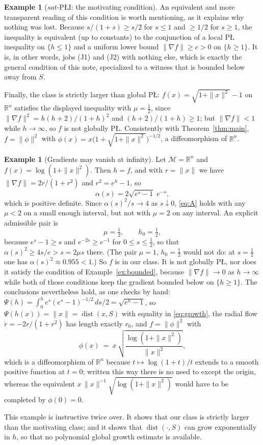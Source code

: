 \documentclass[11pt]{article}
\theoremstyle{plain}
\theoremstyle{definition}
\newtheorem{ex}[thm]{Example}
\theoremstyle{remark}
\newcommand{\M}{\mathcal{M}}
\newcommand{\R}{\mathbb{R}}
\DeclareMathOperator{\dist}{dist}
\begin{document}
\begin{ex}[$sat$-P\L{}I: the motivating condition]
An equivalent and more transparent reading of this condition is worth mentioning,
as it explains why nothing was lost. Because $s/(1+s) \ge s/2$ for $s\le1$ and
$\ge 1/2$ for $s\ge1$, the inequality is equivalent (up to constants) to the
conjunction of a local P\L{} inequality on $\{h\le1\}$ and a uniform lower bound
$\|\nabla f\| \ge c > 0$ on $\{h\ge1\}$. It is, in other words, jobs (J1) and
(J2) with nothing else, which is exactly the general condition of this note,
specialized to a witness that is bounded below away from $S$.

Finally, the class is strictly larger than global P\L{}:
$f(x) = \sqrt{1+\|x\|^2}-1$ on $\R^n$ satisfies the displayed inequality with
$\mu=\tfrac12$, since $\|\nabla f\|^2 = h(h+2)/(1+h)^2$ and
$(h+2)/(1+h)\ge1$; but $\|\nabla f\| < 1$ while $h\to\infty$, so $f$ is not
globally P\L{}. Consistently with Theorem~\ref{thm:main}, $f = \|\phi\|^2$ with
$\phi(x) = x\bigl(1+\sqrt{1+\|x\|^2}\bigr)^{-1/2}$, a diffeomorphism of $\R^n$.
\end{ex}

\begin{ex}[Gradients may vanish at infinity]\label{ex:log}
Let $\M=\R^n$ and $f(x) = \log(1+\|x\|^2)$. Then $h=f$, and with $r=\|x\|$ we
have $\|\nabla f\| = 2r/(1+r^2)$ and $r^2 = e^h-1$, so
\[
  \alpha(s) = 2\sqrt{e^s-1}\;e^{-s} ,
\]
which is positive definite. Since $\alpha(s)^2/s\to4$ as $s\downarrow0$,
\eqref{eq:A} holds with any $\mu<2$ on a small enough interval, but not with
$\mu=2$ on any interval. An explicit admissible pair is
\[
  \mu = \tfrac12 , \qquad h_0 = \tfrac12 ,
\]
because $e^s-1\ge s$ and $e^{-2s}\ge e^{-1}$ for $0\le s\le\tfrac12$, so that
$\alpha(s)^2 \ge 4s/e > s = 2\mu s$ there. (The pair $\mu=1$, $h_0=\tfrac12$ would
not do: at $s=\tfrac12$ one has $\alpha(s)^2\approx0.955<1$.) So $f$ is in our
class. It is not globally P\L{},
nor does it satisfy the condition of Example~\ref{ex:bounded}, because
$\|\nabla f\|\to0$ as $h\to\infty$ while both of those conditions keep the
gradient bounded below on $\{h\ge1\}$. The conclusions nevertheless hold, as one
checks by hand: $\Psi(h) = \int_0^h e^s(e^s-1)^{-1/2}\,ds/2 = \sqrt{e^h-1}$, so
$\Psi(h(x)) = \|x\| = \dist(x,S)$ with equality in \eqref{eq:growth}, the
radial flow $\dot r = -2r/(1+r^2)$ has length exactly $r_0$, and
$f = \|\phi\|^2$ with
\[
  \phi(x) \ =\ x\,\sqrt{\frac{\log(1+\|x\|^2)}{\|x\|^2}} ,
\]
which is a diffeomorphism of $\R^n$ because $t\mapsto\log(1+t)/t$ extends to a
smooth positive function at $t=0$; written this way there is no need to except the
origin, whereas the equivalent $x\,\|x\|^{-1}\sqrt{\log(1+\|x\|^2)}$ would have to
be completed by $\phi(0)=0$.

This example is instructive twice over. It shows that our class is strictly
larger than the motivating class; and it shows that
$\dist(\cdot,S)$ can grow exponentially in $h$, so that no polynomial global
growth estimate is available.
\end{ex}
\end{document}
